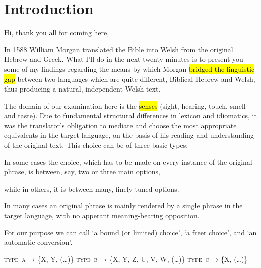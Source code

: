 \section{Introduction}

\begin{paper}
	{\click} Hi, thank you all for coming here,

	{\click} In 1588 William Morgan translated the Bible into Welsh from the original Hebrew and Greek. What I’ll do in the next twenty minutes is to present you some of my findings regarding the means by which Morgan \hl{bridged the linguistic gap} between two languages which are quite different, Biblical Hebrew and Welsh, thus producing a natural, independent Welsh text.

	The domain of our examination here is the \hl{senses} (sight, hearing, touch, smell and taste). Due to fundamental structural differences in lexicon and idiomatics, it was the translator’s obligation to mediate and choose the most appropriate equivalents in the target language, on the basis of his reading and understanding of the original text. This choice can be of three basic types:

	\begin{compactitem}
		\item {\click} In some cases the choice, which has to be made on every instance of the original phrase, is between, say,  two or three main options,
		\item while in others, it is between  many, finely tuned options.
		\item {} In many cases an original phrase is mainly rendered by a single phrase in the target language, with no apperant meaning-bearing opposition.
	\end{compactitem}

	For our purpose we can call
	{\typeA} ‘a bound (or limited) choice’,
	{\typeB} ‘a freer choice’, and
	{\typeC} ‘an automatic conversion’.

\end{paper}

\begin{hopoint}
	\textsc{type~a} → \{X, Y, {\small (…)}\}\hfill
	\textsc{type~b} → \{X, Y, Z, U, V, W, {\small (…)}\}\hfill
	\textsc{type~c} → \{X, {\small (…)}\}
\end{hopoint}

